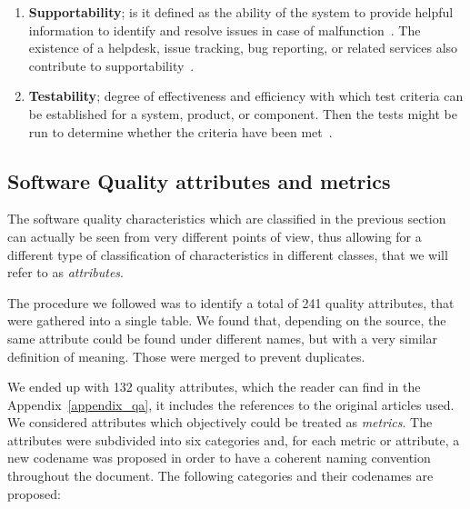 \begin{enumerate}
    \item \textbf{Supportability}; is it defined as the ability of the system to provide helpful information  to identify and resolve issues in case of malfunction~\cite{microsoft_2010}. The existence of a helpdesk,  issue tracking, bug reporting, or related services also contribute to supportability~\cite{orviz_fernandez_eosc-synergy_2020}.

    \item \textbf{Testability}; degree of effectiveness and efficiency with which test criteria can be established for a system, product, or component. Then the tests might be run to determine whether the criteria have been met~\cite{iso_25010_2011_2017}.
\end{enumerate}

\subsection{Software Quality attributes and metrics}
\label{subsec:SW_quality_attributes}

The software quality characteristics which are classified in the previous section can actually be seen from very different points of view, thus allowing for a different type of classification of characteristics in different classes, that we will refer to as \textit{attributes}.

The procedure we followed was to identify a total of 241 quality attributes, that were gathered into a single table. We found that, depending on the source, the same attribute could be found under different names, but with a very similar definition of meaning. Those were merged to prevent duplicates.

We ended up with 132 quality attributes, which the reader can find in the Appendix~\ref{appendix_qa}, it includes the references to the original articles used. We considered attributes which objectively could be treated as \textit{metrics}. The attributes were subdivided into six categories and, for each metric or attribute, a new codename was proposed in order to have a coherent naming convention throughout the document. The following categories and their codenames are proposed:

